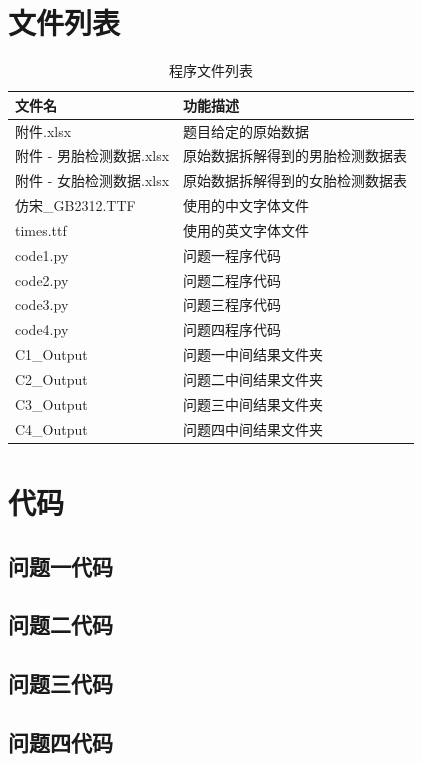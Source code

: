 \documentclass[withoutpreface,bwprint]{cumcmthesis} %
\begin{document}
\begin{appendices}
    \section{文件列表}
    \begin{table}[H]
        \caption{程序文件列表}
        \centering
        \begin{tabularx}{\textwidth}{l l}
            \bottomrule[1.5pt]
            文件名 & 功能描述 \\
            \midrule[1pt]
            附件.xlsx & 题目给定的原始数据\\
            附件 - 男胎检测数据.xlsx & 原始数据拆解得到的男胎检测数据表 \\
            附件 - 女胎检测数据.xlsx & 原始数据拆解得到的女胎检测数据表 \\
            仿宋\_GB2312.TTF & 使用的中文字体文件 \\
            times.ttf & 使用的英文字体文件 \\
            code1.py & 问题一程序代码 \\
            code2.py & 问题二程序代码 \\
            code3.py & 问题三程序代码 \\
            code4.py & 问题四程序代码 \\
            C1\_Output & 问题一中间结果文件夹 \\
            C2\_Output & 问题二中间结果文件夹 \\
            C3\_Output & 问题三中间结果文件夹 \\
            C4\_Output & 问题四中间结果文件夹 \\
            \bottomrule[1.5pt]
        \end{tabularx}
        \label{tab:文件列表}
    \end{table}



    \section{代码}
    \subsection{问题一代码}
            
    \subsection{问题二代码}
        
    \subsection{问题三代码}
        
    \subsection{问题四代码}
        

\end{appendices}
\end{document}
